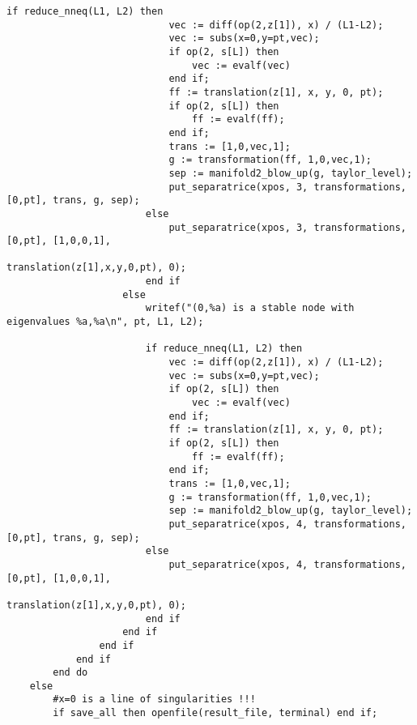 \documentclass[a4paper,10pt]{article}
\begin{document}
\begin{lstlisting}[name=blowup]
                        if reduce_nneq(L1, L2) then
                            vec := diff(op(2,z[1]), x) / (L1-L2);
                            vec := subs(x=0,y=pt,vec);
                            if op(2, s[L]) then
                                vec := evalf(vec)
                            end if;
                            ff := translation(z[1], x, y, 0, pt);
                            if op(2, s[L]) then
                                ff := evalf(ff);
                            end if;
                            trans := [1,0,vec,1];
                            g := transformation(ff, 1,0,vec,1);
                            sep := manifold2_blow_up(g, taylor_level);
                            put_separatrice(xpos, 3, transformations, [0,pt], trans, g, sep);
                        else
                            put_separatrice(xpos, 3, transformations, [0,pt], [1,0,0,1],
                                            translation(z[1],x,y,0,pt), 0);
                        end if
                    else
                        writef("(0,%a) is a stable node with eigenvalues %a,%a\n", pt, L1, L2);

                        if reduce_nneq(L1, L2) then
                            vec := diff(op(2,z[1]), x) / (L1-L2);
                            vec := subs(x=0,y=pt,vec);
                            if op(2, s[L]) then
                                vec := evalf(vec)
                            end if;
                            ff := translation(z[1], x, y, 0, pt);
                            if op(2, s[L]) then
                                ff := evalf(ff);
                            end if;
                            trans := [1,0,vec,1];
                            g := transformation(ff, 1,0,vec,1);
                            sep := manifold2_blow_up(g, taylor_level);
                            put_separatrice(xpos, 4, transformations, [0,pt], trans, g, sep);
                        else
                            put_separatrice(xpos, 4, transformations, [0,pt], [1,0,0,1],
                                            translation(z[1],x,y,0,pt), 0);
                        end if
                    end if
                end if
            end if
        end do
    else
        #x=0 is a line of singularities !!!
        if save_all then openfile(result_file, terminal) end if;


\end{lstlisting}
\end{document}
